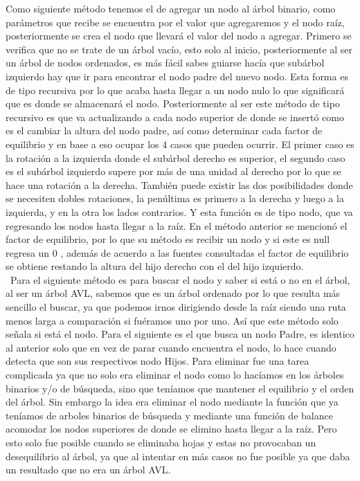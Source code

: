 \documentclass{report}
\begin{document}
Como siguiente método tenemos el de agregar un nodo al árbol binario, como parámetros que recibe se encuentra por el valor que agregaremos y el nodo raíz, posteriormente se crea el nodo que llevará el valor del nodo a agregar. Primero se verifica que no se trate de un árbol vacío, esto solo al inicio, posteriormente al ser un árbol de nodos ordenados, es más fácil sabes guiarse hacía que subárbol izquierdo hay que ir para encontrar el nodo padre del nuevo nodo. Esta forma es de tipo recursiva por lo que acaba hasta llegar a un nodo nulo lo que significará que es donde se almacenará el nodo. Posteriormente al ser este método de tipo recursivo es que va actualizando a cada nodo superior de donde se insertó como es el cambiar la altura del nodo padre, así como determinar cada factor de equilibrio y en base a eso ocupar los 4 casos que pueden ocurrir.
El primer caso es la rotación a la izquierda donde el subárbol derecho es superior, el segundo caso es el subárbol izquierdo supere por más de una unidad al derecho por lo que se hace una rotación a la derecha. También puede existir las dos posibilidades donde se necesiten dobles rotaciones, la penúltima es primero a la derecha y luego a la izquierda, y en la otra los lados contrarios. Y esta función es de tipo nodo, que va regresando los nodos hasta llegar a la raíz.
En el método anterior se mencionó el factor de equilibrio, por lo que su método es recibir un nodo y si este es null regresa un 0 , además de acuerdo a las fuentes consultadas el factor de equilibrio se obtiene restando la altura del hijo derecho con el del hijo izquierdo. \\\
Para el siguiente método es para buscar el nodo y saber si está o no en el árbol, al ser un árbol AVL, sabemos que es un árbol ordenado por lo que resulta más sencillo el buscar, ya que podemos irnos dirigiendo desde la raíz siendo una ruta menos larga a comparación si fuéramos uno por uno. Así que este método solo señala si está el nodo. Para el siguiente es el que busca un nodo Padre, es identico al anterior solo que en vez de parar cuando encuentra el nodo, lo hace cuando detecta que son sus respectivos nodo Hijos.
Para eliminar fue una tarea complicada ya que no solo era eliminar el nodo como lo hacíamos en los árboles binarios y/o de búsqueda, sino que teníamos que mantener el equilibrio y el orden del árbol. Sin embargo la idea era eliminar el nodo mediante la función que ya teníamos de arboles binarios de búsqueda y mediante una función de balance acomodar los nodos superiores de donde se elimino hasta llegar a la raíz. Pero esto solo fue posible cuando se eliminaba hojas y estas no provocaban un desequilibrio al árbol, ya que al intentar en más casos no fue posible ya que daba un resultado que no era un árbol AVL.\\\
\end{document}
